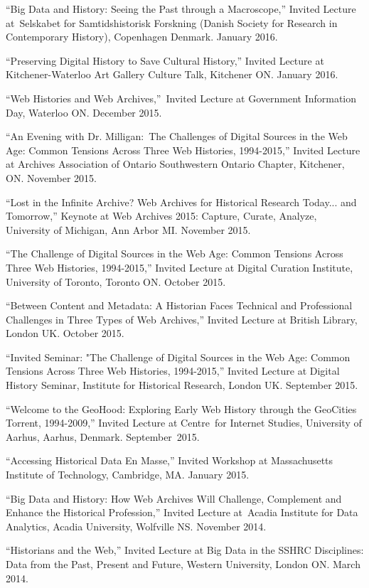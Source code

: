 \documentclass[11pt,article,oneside]{memoir}
\begin{document}
\ind ``Big Data and History: Seeing the Past through a Macroscope,'' Invited Lecture at Selskabet for Samtidshistorisk Forskning (Danish Society for Research in Contemporary History), Copenhagen Denmark. January 2016. 

\ind ``Preserving Digital History to Save Cultural History,'' Invited Lecture at Kitchener-Waterloo Art Gallery Culture Talk, Kitchener ON. January 2016.

\ind ``Web Histories and Web Archives,'' Invited Lecture at Government Information Day, Waterloo ON. December 2015.

\ind ``An Evening with Dr. Milligan: The Challenges of Digital Sources in the Web Age: Common Tensions Across Three Web Histories, 1994-2015,'' Invited Lecture at Archives Association of Ontario Southwestern Ontario Chapter, Kitchener, ON. November 2015.

\ind ``Lost in the Infinite Archive? Web Archives for Historical Research Today... and Tomorrow,'' Keynote at Web Archives 2015: Capture, Curate, Analyze, University of Michigan, Ann Arbor MI. November 2015.

\ind ``The Challenge of Digital Sources in the Web Age: Common Tensions Across Three Web Histories, 1994-2015,'' Invited Lecture at Digital Curation Institute, University of Toronto, Toronto ON. October 2015.

\ind ``Between Content and Metadata: A Historian Faces Technical and Professional Challenges in Three Types of Web Archives,'' Invited Lecture at British Library, London UK. October 2015.

\ind ``Invited Seminar: "The Challenge of Digital Sources in the Web Age: Common Tensions Across Three Web Histories, 1994-2015,'' Invited Lecture at Digital History Seminar, Institute for Historical Research, London UK. September 2015. 

\ind ``Welcome to the GeoHood: Exploring Early Web History through the GeoCities Torrent, 1994-2009,'' Invited Lecture at Centre for Internet Studies, University of Aarhus, Aarhus, Denmark. September 2015.

\ind ``Accessing Historical Data En Masse,'' Invited Workshop at Massachusetts Institute of Technology, Cambridge, MA. January 2015.

\ind ``Big Data and History: How Web Archives Will Challenge, Complement and Enhance the Historical Profession,'' Invited Lecture at Acadia Institute for Data Analytics, Acadia University, Wolfville NS. November 2014.

\ind ``Historians and the Web,'' Invited Lecture at Big Data in the SSHRC Disciplines: Data from the Past, Present and Future, Western University, London ON. March 2014.
\end{document}
